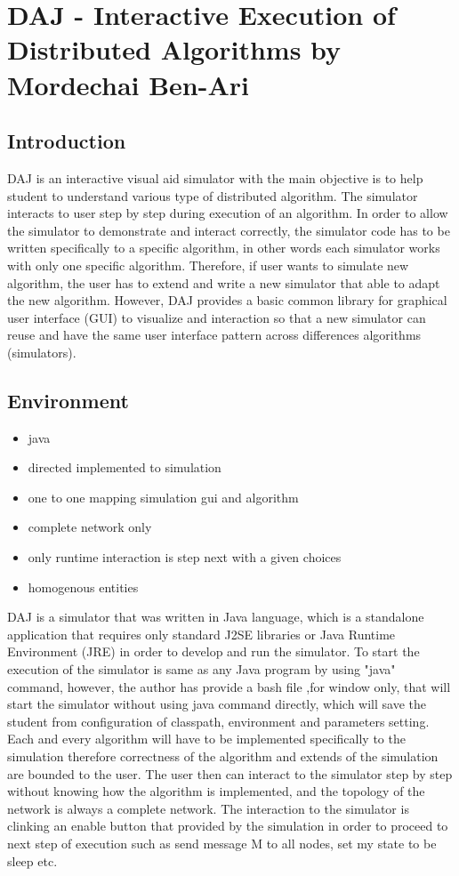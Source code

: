 
\section{DAJ - Interactive Execution of Distributed Algorithms by Mordechai Ben-Ari}

\subsection*{Introduction}
DAJ is an interactive visual aid simulator with the main objective is to help student to understand various type of distributed algorithm. The simulator interacts to user step by step during execution of an algorithm. In order to allow the simulator to demonstrate and interact correctly, the simulator code has to be written specifically to a specific algorithm, in other words each simulator works with only one specific algorithm. Therefore, if user wants to simulate new algorithm, the user has to extend and write a new simulator that able to adapt the new algorithm. However, DAJ provides a basic common library for graphical user interface (GUI) to visualize and interaction so that a new simulator can reuse and have the same user interface pattern across differences algorithms (simulators).

\subsection*{Environment}
\begin{itemize}
\item java
\item directed implemented to simulation
\item one to one mapping simulation gui and algorithm
\item complete network only
\item only runtime interaction is step next with a given choices
\item homogenous entities
\end{itemize}

DAJ is a simulator that was written in Java language, which is a standalone application that requires only standard J2SE libraries or Java Runtime Environment (JRE) in order to develop and run the simulator. To start the execution of the simulator is same as any Java program by using "java" command, however, the author has provide a bash file ,for window only, that will start the simulator without using java command directly, which will save the student from configuration of classpath, environment and parameters setting. Each and every algorithm will have to be implemented specifically to the simulation therefore correctness of the algorithm and extends of the simulation are bounded to the user. The user then can interact to the simulator step by step without knowing how the algorithm is implemented, and the topology of the network is always a complete network. The interaction to the simulator is clinking an enable button that provided by the simulation in order to proceed to next step of execution such as send message M to all nodes, set my state to be sleep etc.


